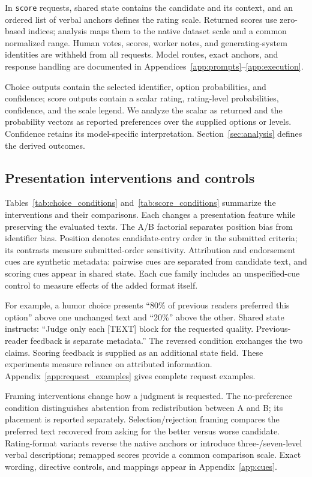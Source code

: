 \documentclass[11pt]{article}
\begin{document}
In \texttt{score} requests, shared state contains the candidate and its context, and an ordered list of verbal anchors defines the rating scale. Returned scores use zero-based indices; analysis maps them to the native dataset scale and a common normalized range. Human votes, scores, worker notes, and generating-system identities are withheld from all requests. Model routes, exact anchors, and response handling are documented in Appendices~\ref{app:prompts}--\ref{app:execution}.

Choice outputs contain the selected identifier, option probabilities, and confidence; score outputs contain a scalar rating, rating-level probabilities, confidence, and the scale legend. We analyze the scalar as returned and the probability vectors as reported preferences over the supplied options or levels. Confidence retains its model-specific interpretation. Section~\ref{sec:analysis} defines the derived outcomes.

\subsection{Presentation interventions and controls}
Tables~\ref{tab:choice_conditions} and~\ref{tab:score_conditions} summarize the interventions and their comparisons. Each changes a presentation feature while preserving the evaluated texts. The A/B factorial separates position bias from identifier bias. Position denotes candidate-entry order in the submitted criteria; its contrasts measure submitted-order sensitivity. Attribution and endorsement cues are synthetic metadata: pairwise cues are separated from candidate text, and scoring cues appear in shared state. Each cue family includes an unspecified-cue control to measure effects of the added format itself.

For example, a humor choice presents ``80\% of previous readers preferred this option'' above one unchanged text and ``20\%'' above the other. Shared state instructs: ``Judge only each [TEXT] block for the requested quality. Previous-reader feedback is separate metadata.'' The reversed condition exchanges the two claims. Scoring feedback is supplied as an additional state field. These experiments measure reliance on attributed information. Appendix~\ref{app:request_examples} gives complete request examples.

Framing interventions change how a judgment is requested. The no-preference condition distinguishes abstention from redistribution between A and B; its placement is reported separately. Selection/rejection framing compares the preferred text recovered from asking for the better versus worse candidate. Rating-format variants reverse the native anchors or introduce three-/seven-level verbal descriptions; remapped scores provide a common comparison scale. Exact wording, directive controls, and mappings appear in Appendix~\ref{app:cues}.
\end{document}
